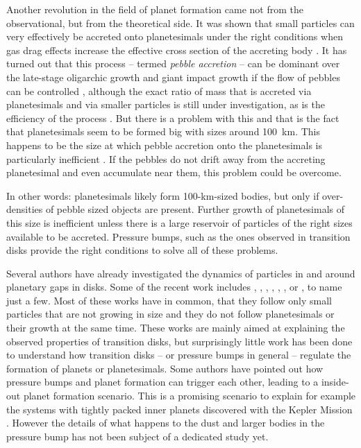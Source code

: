 \documentclass[10pt,fleqn,twoside]{article}
\begin{document}
Another revolution in the field of planet formation came not from the
observational, but from the theoretical side. It was shown that small
particles can very effectively be accreted onto planetesimals under
the right conditions when gas drag effects increase the effective
cross section of the accreting body
\citep{2010A&A...520A..43O,2012A&A...544A..32L}. It has turned out
that this process -- termed \textit{pebble accretion} -- can be
dominant over the late-stage oligarchic growth and giant impact growth
if the flow of pebbles can be controlled \citep{2015Natur.524..322L},
although the exact ratio of mass that is accreted via planetesimals
and via smaller particles is still under investigation, as is the
efficiency of the process
\citep[see][]{2014A&A...572A..72G,2016A&A...586A..66V,2016arXiv160708250O}.
But there is a problem with this and that is the fact that
planetesimals seem to be formed big \citep[][Klahr et al., submitted
to Nature]{2009Icar..204..558M} with sizes around \SI{100}{km}. This
happens to be the size at which pebble accretion onto the
planetesimals is particularly inefficient \citep{2016A&A...586A..66V}.
If the pebbles do not drift away from the accreting planetesimal and
even accumulate near them, this problem could be overcome.

\begin{highlight}
In other words: planetesimals likely form 100-km-sized bodies, but
only if over-densities of pebble sized objects are present. Further
growth of planetesimals of this size is inefficient unless there is a
large reservoir of particles of the right sizes available to be
accreted. Pressure bumps, such as the ones observed in transition
disks provide the right conditions to solve all of these problems.
\end{highlight}

Several authors have already investigated the dynamics of particles in
and around planetary gaps in disks. Some of the recent work includes
\citet{2004A&A...425L...9P,2006A&A...453.1129P},
\citet{2006MNRAS.373.1619R}, \citet{2009A&A...493.1125L},
\citet{2012ApJ...755....6Z}, \citet{2012A&A...547A..58G},
\citet{2013A&A...553L...3A}, or \citet{2015A&A...584A.110P}, to name
just a few. Most of these works have in common, that they follow only
small particles that are not growing in size and they do not follow
planetesimals or their growth at the same time. These works are mainly
aimed at explaining the observed properties of transition disks, but
surprisingly little work has been done to understand how transition
disks -- or pressure bumps in general -- regulate the formation of
planets or planetesimals. Some authors \citep[e.g.,][and following
papers in that series]{2014ApJ...780...53C} have pointed out how
pressure bumps and planet formation can trigger each other, leading to
a inside-out planet formation scenario. This is a promising scenario
to explain for example the systems with tightly packed inner planets
discovered with the Kepler Mission \citep{2012ApJ...761...92F}.
However the details of what happens to the dust and larger bodies in
the pressure bump has not been subject of a dedicated study yet.
\end{document}
